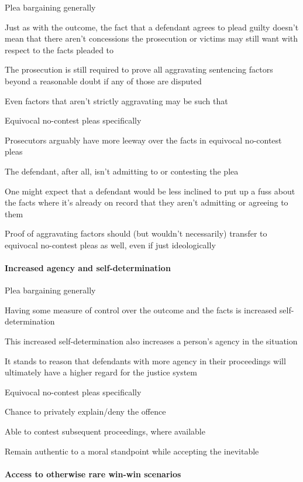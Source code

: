 Plea bargaining generally

Just as with the outcome, the fact that a defendant agrees to plead guilty doesn't mean that there aren't concessions the prosecution or victims may still want with respect to the facts pleaded to

The prosecution is still required to prove all aggravating sentencing factors beyond a reasonable doubt if any of those are disputed

Even factors that aren't strictly aggravating may be such that

Equivocal no-contest pleas specifically

Prosecutors arguably have more leeway over the facts in equivocal no-contest pleas

The defendant, after all, isn't admitting to or contesting the plea

One might expect that a defendant would be less inclined to put up a fuss about the facts where it's already on record that they aren't admitting or agreeing to them

Proof of aggravating factors should (but wouldn't necessarily) transfer to equivocal no-contest pleas as well, even if just ideologically

\paragraph{Increased agency and self-determination\\}

Plea bargaining generally

Having some measure of control over the outcome and the facts is increased self-determination

This increased self-determination also increases a person's agency in the situation

It stands to reason that defendants with more agency in their proceedings will ultimately have a higher regard for the justice system

Equivocal no-contest pleas specifically

Chance to privately explain/deny the offence

Able to contest subsequent proceedings, where available

Remain authentic to a moral standpoint while accepting the inevitable

\paragraph{Access to otherwise rare win-win scenarios}


